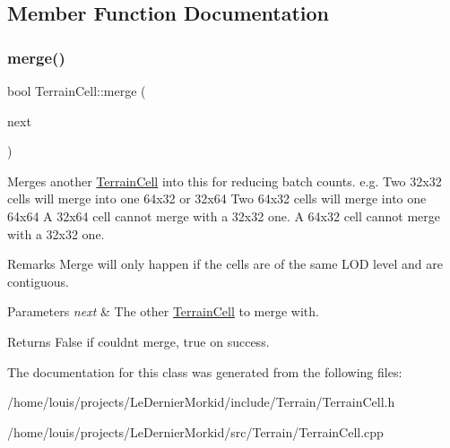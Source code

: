 \subsection{Member Function Documentation}
\mbox{\label{class_terrain_cell_a18155abf464d4f6d1f3bf59a21eee301}} 
\subsubsection{\texorpdfstring{merge()}{merge()}}
{\footnotesize\ttfamily bool Terrain\+Cell\+::merge (\begin{DoxyParamCaption}\item[{\hyperlink{class_terrain_cell}{Terrain\+Cell} $\ast$}]{next }\end{DoxyParamCaption})}

Merges another \hyperlink{class_terrain_cell}{Terrain\+Cell} into \textquotesingle{}this\textquotesingle{} for reducing batch counts. e.\+g. Two 32x32 cells will merge into one 64x32 or 32x64 Two 64x32 cells will merge into one 64x64 A 32x64 cell cannot merge with a 32x32 one. A 64x32 cell cannot merge with a 32x32 one. \begin{DoxyRemark}{Remarks}
Merge will only happen if the cells are of the same L\+OD level and are contiguous. 
\end{DoxyRemark}

\begin{DoxyParams}{Parameters}
{\em next} & The other \hyperlink{class_terrain_cell}{Terrain\+Cell} to merge with. \\
\hline
\end{DoxyParams}
\begin{DoxyReturn}{Returns}
False if couldn\textquotesingle{}t merge, true on success. 
\end{DoxyReturn}


The documentation for this class was generated from the following files\+:\begin{DoxyCompactItemize}
\item 
/home/louis/projects/\+Le\+Dernier\+Morkid/include/\+Terrain/Terrain\+Cell.\+h\item 
/home/louis/projects/\+Le\+Dernier\+Morkid/src/\+Terrain/Terrain\+Cell.\+cpp\end{DoxyCompactItemize}
